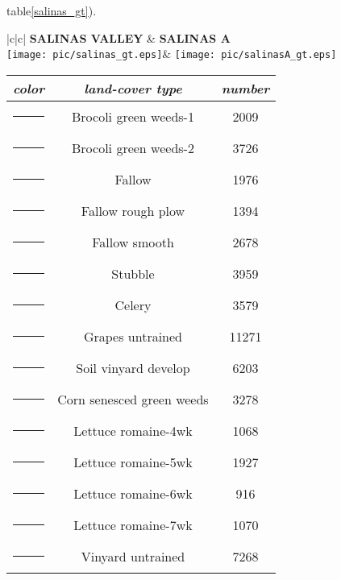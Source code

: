 \documentclass{article}
\newcommand\crule[3][black]{\textcolor{#1}{\rule{#2}{#3}}}
\begin{document}
\begin{enumerate}[1)]
		table\ref{salinas_gt}).
		\begin{table}[h]
			\centering
			\begin{tabular}{|c|c|}
				\hline
				\textbf{SALINAS VALLEY}  & \textbf{SALINAS A}\\
				\hline
				\texttt{[image: pic/salinas\_gt.eps]}&
				\texttt{[image: pic/salinasA\_gt.eps]}\\
				\hline
				\begin{tabular}{ccc}
					\footnotesize
					\textit{color}&\textit{land-cover type}&\textit{number}\\
					\hline
					\crule[salinas_corrected1]{0.02\textwidth}{0.02\textwidth} &Brocoli green weeds-1 &2009  \\
					\crule[salinas_corrected2]{0.02\textwidth}{0.02\textwidth} &Brocoli green weeds-2 &3726  \\
					\crule[salinas_corrected3]{0.02\textwidth}{0.02\textwidth} &Fallow &1976  \\
					\crule[salinas_corrected4]{0.02\textwidth}{0.02\textwidth} &Fallow rough plow &1394  \\
					\crule[salinas_corrected5]{0.02\textwidth}{0.02\textwidth} &Fallow smooth &2678  \\
					\crule[salinas_corrected6]{0.02\textwidth}{0.02\textwidth} &Stubble &3959  \\
					\crule[salinas_corrected7]{0.02\textwidth}{0.02\textwidth} &Celery &3579  \\
					\crule[salinas_corrected8]{0.02\textwidth}{0.02\textwidth} &Grapes untrained &11271  \\
					\crule[salinas_corrected9]{0.02\textwidth}{0.02\textwidth} &Soil vinyard develop &6203  \\
					\crule[salinas_corrected10]{0.02\textwidth}{0.02\textwidth} &Corn senesced green weeds &3278  \\
					\crule[salinas_corrected11]{0.02\textwidth}{0.02\textwidth} &Lettuce romaine-4wk &1068  \\
					\crule[salinas_corrected12]{0.02\textwidth}{0.02\textwidth} &Lettuce romaine-5wk &1927  \\
					\crule[salinas_corrected13]{0.02\textwidth}{0.02\textwidth} &Lettuce romaine-6wk &916  \\
					\crule[salinas_corrected14]{0.02\textwidth}{0.02\textwidth} &Lettuce romaine-7wk &1070  \\
					\crule[salinas_corrected15]{0.02\textwidth}{0.02\textwidth} &Vinyard untrained &7268  \\

\end{tabular}
\end{tabular}
\end{table}
\end{enumerate}
\end{document}
